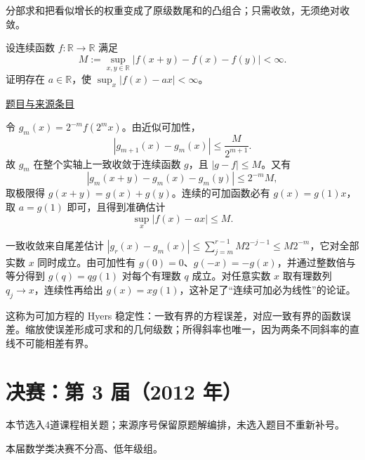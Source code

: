 \documentclass[12pt,fontset=fandol]{ctexart}
\begin{document}
\begin{remark}[方法与条件]分部求和把看似增长的权重变成了原级数尾和的凸组合；只需收敛，无须绝对收敛。\end{remark}

\begin{example}[来源序号5]\label{ex:fin02-all:5}\label{pr:fin02-all:5}

设连续函数 $f:\mathbb R\to\mathbb R$ 满足
\[
M:=\sup_{x,y\in\mathbb R}|f(x+y)-f(x)-f(y)|<\infty.
\]
证明存在 $a\in\mathbb R$，使 $\sup_x|f(x)-ax|<\infty$。

\par\href{https://github.com/lzxcr/cmc-mathematics/blob/64916fa1fdbc3e444a652eca204d5669058ee321/src/problems/finals/02/05.md}{题目与来源条目}

\end{example}

\begin{solve}\label{ans:fin02-all:5}

令 $g_m(x)=2^{-m}f(2^mx)$。由近似可加性，
\[
|g_{m+1}(x)-g_m(x)|\le\frac{M}{2^{m+1}}.
\]
故 $g_m$ 在整个实轴上一致收敛于连续函数 $g$，且 $|g-f|\le M$。又有
\[
|g_m(x+y)-g_m(x)-g_m(y)|\le2^{-m}M,
\]
取极限得 $g(x+y)=g(x)+g(y)$。连续的可加函数必有 $g(x)=g(1)x$，取 $a=g(1)$ 即可，且得到准确估计
\[
\sup_x|f(x)-ax|\le M.
\]

一致收敛来自尾差估计 $|g_r(x)-g_m(x)|\le\sum_{j=m}^{r-1}M2^{-j-1}\le M2^{-m}$，它对全部实数 $x$ 同时成立。由可加性有 $g(0)=0$、$g(-x)=-g(x)$，并通过整数倍与等分得到 $g(q)=qg(1)$ 对每个有理数 $q$ 成立。对任意实数 $x$ 取有理数列 $q_j\to x$，连续性再给出 $g(x)=xg(1)$，这补足了“连续可加必为线性”的论证。

\end{solve}

\begin{remark}[方法与条件]这称为可加方程的 Hyers 稳定性：一致有界的方程误差，对应一致有界的函数误差。缩放使误差形成可求和的几何级数；所得斜率也唯一，因为两条不同斜率的直线不可能相差有界。\end{remark}

\section{决赛：第 3 届（2012 年）}

本节选入4道课程相关题；来源序号保留原题解编排，未选入题目不重新补号。

\begin{remark}[来源说明]本届数学类决赛不分高、低年级组。\end{remark}
\end{document}
